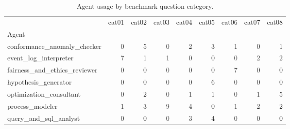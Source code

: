 \begin{table}
\caption{Agent usage by benchmark question category.}
\label{tab:agent-usage-by-category}
\begin{tabular}{lrrrrrrrr}
\toprule
 & cat01 & cat02 & cat03 & cat04 & cat05 & cat06 & cat07 & cat08 \\
Agent &  &  &  &  &  &  &  &  \\
\midrule
conformance\_anomaly\_checker & 0 & 5 & 0 & 2 & 3 & 1 & 0 & 1 \\
event\_log\_interpreter & 7 & 1 & 1 & 0 & 0 & 0 & 2 & 2 \\
fairness\_and\_ethics\_reviewer & 0 & 0 & 0 & 0 & 0 & 7 & 0 & 0 \\
hypothesis\_generator & 0 & 0 & 0 & 0 & 6 & 0 & 0 & 0 \\
optimization\_consultant & 0 & 2 & 0 & 1 & 1 & 0 & 1 & 5 \\
process\_modeler & 1 & 3 & 9 & 4 & 0 & 1 & 2 & 2 \\
query\_and\_sql\_analyst & 0 & 0 & 0 & 3 & 4 & 0 & 0 & 0 \\
\bottomrule
\end{tabular}
\end{table}

